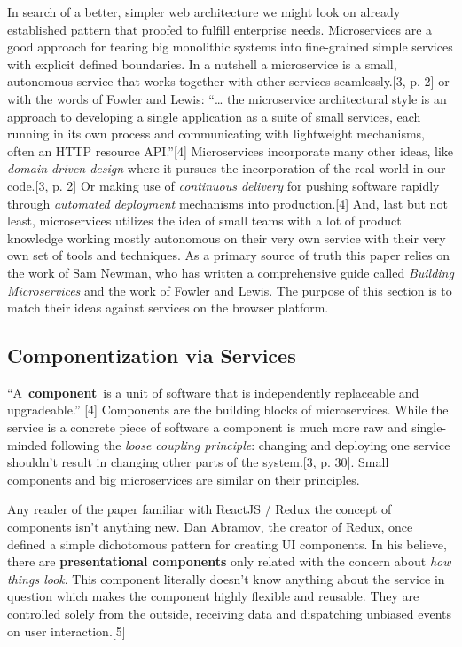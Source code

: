 \documentclass[]{assets/latex/ieee}
\begin{document}
In search of a better, simpler web architecture we might look on already
established pattern that proofed to fulfill enterprise needs.
Microservices are a good approach for tearing big monolithic systems
into fine-grained simple services with explicit defined boundaries. In a
nutshell a microservice is a small, autonomous service that works
together with other services seamlessly.{[}3, p. 2{]} or with the words
of Fowler and Lewis: ``\ldots{} the microservice architectural style is
an approach to developing a single application as a suite of small
services, each running in its own process and communicating with
lightweight mechanisms, often an HTTP resource API.''{[}4{]}
Microservices incorporate many other ideas, like \emph{domain-driven
design} where it pursues the incorporation of the real world in our
code.{[}3, p. 2{]} Or making use of \emph{continuous delivery} for
pushing software rapidly through \emph{automated deployment} mechanisms
into production.{[}4{]} And, last but not least, microservices utilizes
the idea of small teams with a lot of product knowledge working mostly
autonomous on their very own service with their very own set of tools
and techniques. As a primary source of truth this paper relies on the
work of Sam Newman, who has written a comprehensive guide called
\emph{Building Microservices} and the work of Fowler and Lewis. The
purpose of this section is to match their ideas against services on the
browser platform.

\subsection{Componentization via
Services}\label{componentization-via-services}

``A~\textbf{component}~is a unit of software that is independently
replaceable and upgradeable.'' {[}4{]} Components are the building
blocks of microservices. While the service is a concrete piece of
software a component is much more raw and single-minded following the
\emph{loose coupling principle}: changing and deploying one service
shouldn't result in changing other parts of the system.{[}3, p. 30{]}.
Small components and big microservices are similar on their principles.

Any reader of the paper familiar with ReactJS / Redux the concept of
components isn't anything new. Dan Abramov, the creator of Redux, once
defined a simple dichotomous pattern for creating UI components. In his
believe, there are \textbf{presentational components} only related with
the concern about \emph{how things look}. This component literally
doesn't know anything about the service in question which makes the
component highly flexible and reusable. They are controlled solely from
the outside, receiving data and dispatching unbiased events on user
interaction.{[}5{]}
\end{document}
